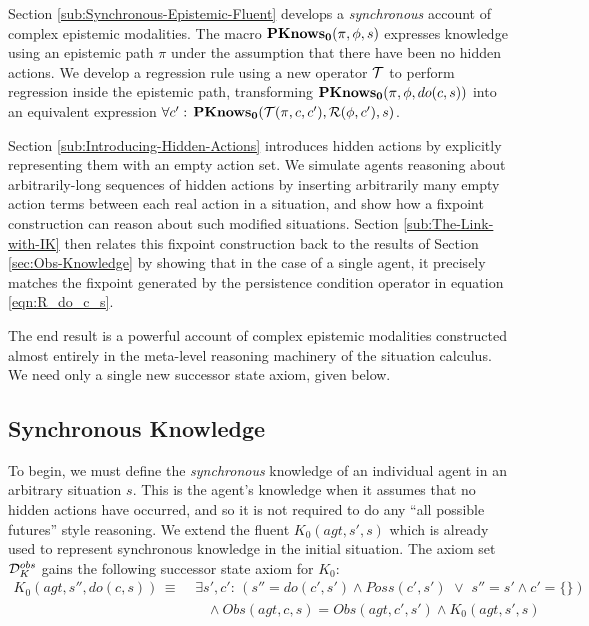 Section \ref{sub:Synchronous-Epistemic-Fluent} develops a \emph{synchronous}
account of complex epistemic modalities. The macro $\mathbf{PKnows_{0}}(\pi,\phi,s)$
expresses knowledge using an epistemic path $\pi$ under the assumption
that there have been no hidden actions. We develop a regression rule
using a new operator $\mathcal{T}$ to perform regression inside the epistemic
path, transforming $\mathbf{PKnows_{0}}(\pi,\phi,do(c,s))$ into an equivalent
expression $\forall c':\,\mathbf{PKnows_{0}}(\mathcal{T}(\pi,c,c'),\mathcal{R}(\phi,c'),s)$.

Section \ref{sub:Introducing-Hidden-Actions} introduces hidden actions
by explicitly representing them with an empty action set. We simulate
agents reasoning about arbitrarily-long sequences of hidden actions
by inserting arbitrarily many empty action terms between each real
action in a situation, and show how a fixpoint construction can reason
about such modified situations. Section \ref{sub:The-Link-with-IK}
then relates this fixpoint construction back to the results of Section
\ref{sec:Obs-Knowledge} by showing that in the case of a single agent,
it precisely matches the fixpoint generated by the persistence condition
operator in equation \eqref{eqn:R_do_c_s}. 

The end result is a powerful account of complex epistemic modalities
constructed almost entirely in the meta-level reasoning machinery
of the situation calculus. We need only a single new successor state
axiom, given below.


\subsection{Synchronous Knowledge\label{sub:Syncrhonous-Knowledge}}

To begin, we must define the \emph{synchronous }knowledge of an individual
agent in an arbitrary situation $s$. This is the agent's knowledge
when it assumes that no hidden actions have occurred, and so it is
not required to do any {}``all possible futures'' style reasoning.
We extend the fluent $K_{0}(agt,s',s)$ which is already used to represent
synchronous knowledge in the initial situation. The axiom set $\mathcal{D}_{K}^{obs}$
gains the following successor state axiom for $K_{0}$:\begin{align}
K_{0}(agt,s'',do(c,s))\,\equiv\,\, & \exists s',c':\,\left(s''=do(c',s')\wedge Poss(c',s')\,\,\vee\,\, s''=s'\wedge c'=\{\}\right)\nonumber \\
 & \,\,\,\,\,\wedge Obs(agt,c,s)=Obs(agt,c',s')\wedge K_{0}(agt,s',s)\label{eq:K0_ssa}\end{align}


